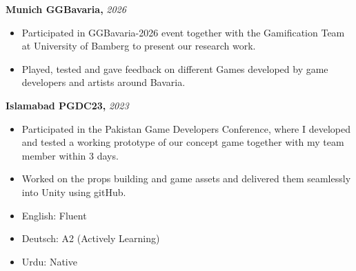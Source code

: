 \documentclass[10.5pt,a4paper]{article}
\begin{document}
\small\textbf{Munich GGBavaria,} \textit{2026}
\begin{itemize}
  \small
  \item Participated in GGBavaria-2026 event together with the Gamification Team at University of Bamberg to present our research work.
  \item Played, tested and gave feedback on different Games developed by game developers and artists around Bavaria.
\end{itemize}

\vspace{2pt}
\small\textbf{Islamabad PGDC23,} \textit{2023}
\begin{itemize}
  \small
  \item Participated in the Pakistan Game Developers Conference, where I developed and tested a working prototype of our concept game together with my team member within 3 days.
  \item Worked on the props building and game assets and delivered them seamlessly into Unity using gitHub.
\end{itemize}

\vspace{2pt}
\small
\begin{itemize}
  \item English: Fluent
  \item Deutsch: A2 (Actively Learning)
  \item Urdu: Native
\end{itemize}
\end{document}

